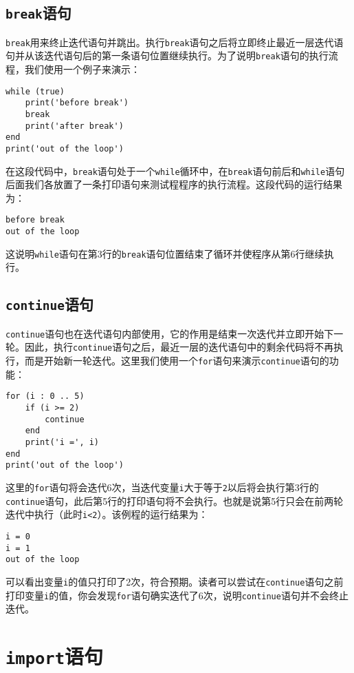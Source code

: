 \subsection{\texttt{break}语句}

\texttt{break}用来终止迭代语句并跳出。执行\texttt{break}语句之后将立即终止最近一层迭代语句并从该迭代语句后的第一条语句位置继续执行。为了说明\texttt{break}语句的执行流程，我们使用一个例子来演示：
\begin{lstlisting}[language=berry]
while (true)
    print('before break')
    break
    print('after break')
end
print('out of the loop')
\end{lstlisting}
在这段代码中，\texttt{break}语句处于一个\texttt{while}循环中，在\texttt{break}语句前后和\texttt{while}语句后面我们各放置了一条打印语句来测试程程序的执行流程。这段代码的运行结果为：
\begin{lstlisting}[numbers=none]
before break
out of the loop
\end{lstlisting}
这说明\texttt{while}语句在第3行的\texttt{break}语句位置结束了循环并使程序从第6行继续执行。

\subsection{\texttt{continue}语句}

\texttt{continue}语句也在迭代语句内部使用，它的作用是结束一次迭代并立即开始下一轮。因此，执行\texttt{continue}语句之后，最近一层的迭代语句中的剩余代码将不再执行，而是开始新一轮迭代。这里我们使用一个\texttt{for}语句来演示\texttt{continue}语句的功能：
\begin{lstlisting}[language=berry]
for (i : 0 .. 5)
    if (i >= 2)
        continue
    end
    print('i =', i)
end
print('out of the loop')
\end{lstlisting}
这里的\texttt{for}语句将会迭代6次，当迭代变量\texttt{i}大于等于\texttt{2}以后将会执行第3行的\texttt{continue}语句，此后第5行的打印语句将不会执行。也就是说第5行只会在前两轮迭代中执行（此时\texttt{i<2}）。该例程的运行结果为：
\begin{lstlisting}[numbers=none]
i = 0
i = 1
out of the loop
\end{lstlisting}
可以看出变量\texttt{i}的值只打印了2次，符合预期。读者可以尝试在\texttt{continue}语句之前打印变量\texttt{i}的值，你会发现\texttt{for}语句确实迭代了6次，说明\texttt{continue}语句并不会终止迭代。

\section{\texttt{import}语句}

